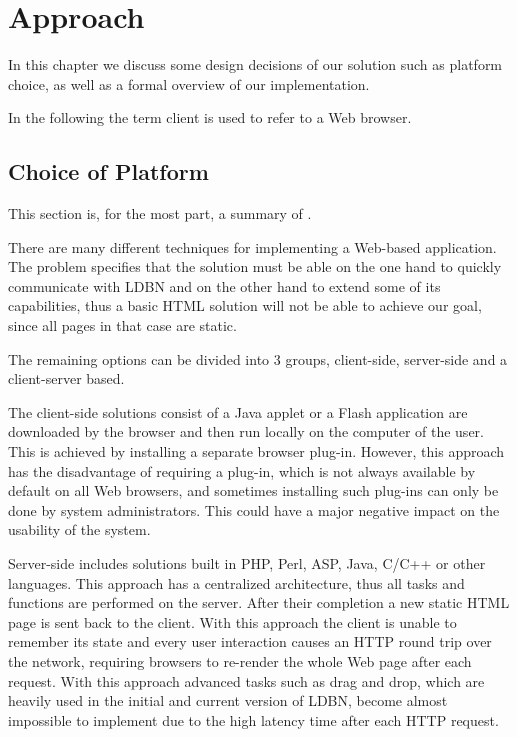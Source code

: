 \chapter{Approach}
\label{chap:approach}
In this chapter we discuss some design decisions of our solution such as 
platform choice, as well as a formal overview of our implementation. 

In the following the term client is used to refer to a Web browser.

\section{Choice of Platform}
\label{sec:platform}
This section is, for the most part, a summary of \cite[Section~3.1 and Section~3.2]{mt1}.

There are many different techniques for implementing a Web-based application. 
The problem specifies that the solution must be able on the one hand to 
quickly communicate with LDBN 
and on the other hand to extend some of its capabilities, 
thus a basic HTML solution will not be able to achieve our goal, 
since all pages in that case are static. 

The remaining options can be divided into 3 groups, client-side, server-side and
a client-server based. 

The client-side solutions consist of a Java applet or a Flash
application are downloaded by the browser and then run locally on the computer of the user.
This is achieved by installing a separate browser plug-in. However, this approach has the disadvantage
of requiring a plug-in, which is not always available by default on all Web browsers, and sometimes
installing such plug-ins can only be done by system administrators. This could have a major negative
impact on the usability of the system. 

Server-side includes solutions built in PHP, Perl, ASP, Java, C/C++ or other languages.
This approach
has a centralized architecture, thus all tasks and functions are performed on the server.
After their completion a new static HTML page is sent back to the client.
With this approach the client is unable to remember its state and 
every user interaction causes an HTTP round trip over the network, 
requiring browsers to re-render the whole Web page after each request. With this approach
advanced tasks such as drag and drop, which are heavily used in the initial and current
version of LDBN, become almost impossible to implement due to the high latency time after each
HTTP request. 

